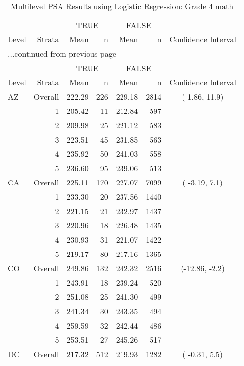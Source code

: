 \begin{longtable}{lrrr@{\extracolsep{.25cm}}rrc}
\caption{Multilevel PSA Results using Logistic Regression: Grade 4 math} \\ 
   \hline & & \multicolumn{2}{c}{TRUE} & \multicolumn{2}{c}{FALSE} & \\ \cline{3-4} \cline{5-6} Level & Strata & Mean & n & Mean & n & Confidence Interval \\ \hline\endfirsthead \multicolumn{7}{l}{{...continued from previous page}}\\ \hline  & & \multicolumn{2}{c}{TRUE} & \multicolumn{2}{c}{FALSE} & \\ \cline{3-4} \cline{5-6} Level & Strata & Mean & n & Mean & n & Confidence Interval \\ \hline \endhead \endfoot \endlastfoot  \hline
AZ & Overall & 222.29 & 226 & 229.18 & 2814 & (  1.86, 11.9) \\ 
   & 1 & 205.42 &  11 & 212.84 & 597 &  \\ 
   & 2 & 209.98 &  25 & 221.12 & 583 &  \\ 
   & 3 & 223.51 &  45 & 231.85 & 563 &  \\ 
   & 4 & 235.92 &  50 & 241.03 & 558 &  \\ 
   & 5 & 236.60 &  95 & 239.06 & 513 &  \\ 
   \hline
CA & Overall & 225.11 & 170 & 227.07 & 7099 & ( -3.19,  7.1) \\ 
   & 1 & 233.30 &  20 & 237.56 & 1440 &  \\ 
   & 2 & 221.15 &  21 & 232.97 & 1437 &  \\ 
   & 3 & 220.96 &  18 & 226.48 & 1435 &  \\ 
   & 4 & 230.93 &  31 & 221.07 & 1422 &  \\ 
   & 5 & 219.17 &  80 & 217.16 & 1365 &  \\ 
   \hline
CO & Overall & 249.86 & 132 & 242.32 & 2516 & (-12.86, -2.2) \\ 
   & 1 & 243.91 &  18 & 239.24 & 520 &  \\ 
   & 2 & 251.08 &  25 & 241.30 & 499 &  \\ 
   & 3 & 241.34 &  30 & 243.35 & 494 &  \\ 
   & 4 & 259.59 &  32 & 242.44 & 486 &  \\ 
   & 5 & 253.51 &  27 & 245.26 & 517 &  \\ 
   \hline
DC & Overall & 217.32 & 512 & 219.93 & 1282 & ( -0.31,  5.5) \\ 

\end{longtable}
